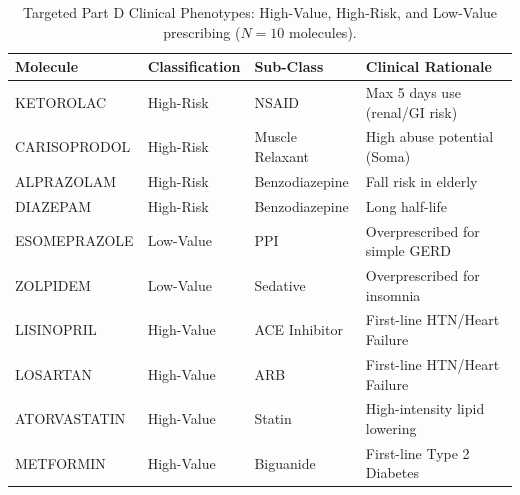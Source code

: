 \begin{table}[htbp]
\caption{Targeted Part D Clinical Phenotypes: High-Value, High-Risk, and Low-Value prescribing ($N=10$ molecules).}
\label{tab:drugs}
\begin{tabular}{llp{3cm}p{4cm}}
\toprule
\rowcolor{gray!10}
Molecule & Classification & Sub-Class & Clinical Rationale \\
\midrule
KETOROLAC & High-Risk & NSAID & Max 5 days use (renal/GI risk) \\
CARISOPRODOL & High-Risk & Muscle Relaxant & High abuse potential (Soma) \\
ALPRAZOLAM & High-Risk & Benzodiazepine & Fall risk in elderly \\
DIAZEPAM & High-Risk & Benzodiazepine & Long half-life \\
ESOMEPRAZOLE & Low-Value & PPI & Overprescribed for simple GERD \\
ZOLPIDEM & Low-Value & Sedative & Overprescribed for insomnia \\
LISINOPRIL & High-Value & ACE Inhibitor & First-line HTN/Heart Failure \\
LOSARTAN & High-Value & ARB & First-line HTN/Heart Failure \\
ATORVASTATIN & High-Value & Statin & High-intensity lipid lowering \\
METFORMIN & High-Value & Biguanide & First-line Type 2 Diabetes \\
\bottomrule
\end{tabular}
\end{table}
